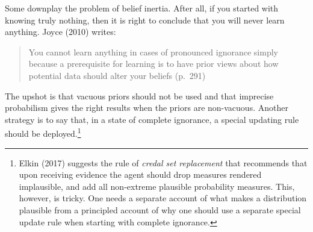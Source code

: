 \documentclass[
  letterpaper,
  DIV=11,
  numbers=noendperiod]{scrartcl}
\begin{document}
Some downplay the problem of belief inertia. After all, if you started
with knowing truly nothing, then it is right to conclude that you will
never learn anything. Joyce (2010) writes:

\begin{quote}
You cannot learn anything in cases of pronounced ignorance simply
because a prerequisite for learning is to have prior views about how
potential data should alter your beliefs (p.~291)
\end{quote}

\noindent The upshot is that vacuous priors should not be used and that
imprecise probabilism gives the right results when the priors are
non-vacuous.  Another
strategy is to say that, in a state of complete ignorance, a special
updating rule should be deployed.\footnote{Elkin (2017) suggests the
  rule of \emph{credal set replacement} that recommends that upon
  receiving evidence the agent should drop measures rendered
  implausible, and add all non-extreme plausible probability measures.
  This, however, is tricky. One needs a separate account of what makes a
  distribution plausible from a principled account of why one should use
  a separate special update rule when starting with complete ignorance.}
\end{document}
